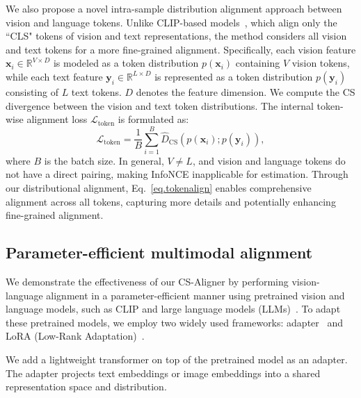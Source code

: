 We also propose a novel intra-sample distribution alignment approach between vision and language tokens. Unlike CLIP-based models~\citep{radford2021learning}, which align only the ``CLS" tokens of vision and text representations, the method considers all vision and text tokens for a more fine-grained alignment. Specifically, each vision feature $\mathbf{x}_i \in \mathbb{R}^{V \times D}$ is modeled as a token distribution $p(\mathbf{x}_i)$ containing $V$ vision tokens, while each text feature $\mathbf{y}_i \in \mathbb{R}^{L \times D}$ is represented as a token distribution $p(\mathbf{y}_i)$ consisting of $L$ text tokens. $D$ denotes the feature dimension.  
We compute the CS divergence between the vision and text token distributions. The internal token-wise alignment loss $\mathcal{L}_{\text{token}}$ is formulated as:
\begin{equation} 
\mathcal{L}_{\text{token}} = \frac{1}{B} \sum_{i=1}^B \widehat{D}_{\text{CS}}(p(\mathbf{x}_i); p(\mathbf{y}_i)), 
\label{eq.tokenalign}
\end{equation}
where $B$ is the batch size. In general, $V \neq L$, and vision and language tokens do not have a direct pairing, making InfoNCE inapplicable for estimation. 
Through our distributional alignment, Eq.~\eqref{eq.tokenalign} enables comprehensive alignment across all tokens, capturing more details and potentially enhancing fine-grained alignment.

\subsection{Parameter-efficient multimodal alignment}
 
We demonstrate the effectiveness of our CS-Aligner by performing vision-language alignment in a parameter-efficient manner using pretrained vision and language models, such as CLIP and large language models (LLMs)~\citep{dubey2024llama}. To adapt these pretrained models, we employ two widely used frameworks: adapter~\citep{gao2024clip} and LoRA (Low-Rank Adaptation)~\citep{hu2021lora}.  

We add a lightweight transformer \citep{vaswani2017attention} on top of the pretrained model as an adapter. 
The adapter projects text embeddings or image embeddings into a shared representation space and distribution.



